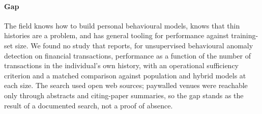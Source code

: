 \paragraph{Gap}
The field knows how to build personal behavioural models, knows that thin histories are a problem, and has general tooling for performance against training-set size. We found no study that reports, for unsupervised behavioural anomaly detection on financial transactions, performance as a function of the number of transactions in the individual's own history, with an operational sufficiency criterion and a matched comparison against population and hybrid models at each size. The search used open web sources; paywalled venues were reachable only through abstracts and citing-paper summaries, so the gap stands as the result of a documented search, not a proof of absence.
